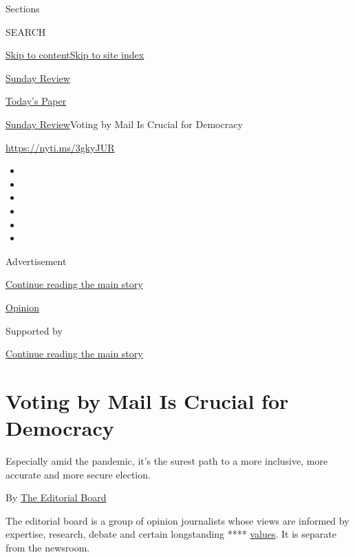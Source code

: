 Sections

SEARCH

\protect\hyperlink{site-content}{Skip to
content}\protect\hyperlink{site-index}{Skip to site index}

\href{https://www.nytimes3xbfgragh.onion/section/opinion/sunday}{Sunday
Review}

\href{https://myaccount.nytimes3xbfgragh.onion/auth/login?response_type=cookie\&client_id=vi}{}

\href{https://www.nytimes3xbfgragh.onion/section/todayspaper}{Today's
Paper}

\href{/section/opinion/sunday}{Sunday Review}\textbar{}Voting by Mail Is
Crucial for Democracy

\url{https://nyti.ms/3gkyJUR}

\begin{itemize}
\item
\item
\item
\item
\item
\item
\end{itemize}

Advertisement

\protect\hyperlink{after-top}{Continue reading the main story}

\href{/section/opinion}{Opinion}

Supported by

\protect\hyperlink{after-sponsor}{Continue reading the main story}

\hypertarget{voting-by-mail-is-crucial-for-democracy}{%
\section{Voting by Mail Is Crucial for
Democracy}\label{voting-by-mail-is-crucial-for-democracy}}

Especially amid the pandemic, it's the surest path to a more inclusive,
more accurate and more secure election.

By
\href{https://www.nytimes3xbfgragh.onion/interactive/opinion/editorialboard.html}{The
Editorial Board}

The editorial board is a group of opinion journalists whose views are
informed by expertise, research, debate and certain longstanding ****
\href{https://www.nytimes3xbfgragh.onion/interactive/2018/opinion/editorialboard.html}{values}.
It is separate from the newsroom.

